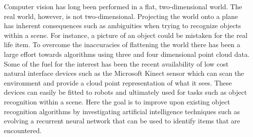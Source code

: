 Computer vision has long been performed in a flat, two-dimensional world. The real world, however, is not two-dimensional. Projecting the world onto a plane has inherent consequences such as ambiguities when trying to recognize objects within a scene. For instance, a picture of an object could be mistaken for the real life item. To overcome the inaccuracies of flattening the world there has been a large effort towards algorithms using three and four dimensional point cloud data. Some of the fuel for the interest has been the recent availability of low cost natural interface devices such as the Microsoft Kinect sensor which can scan the environment and provide a cloud point representation of what it sees. These devices can easily be fitted to robots and ultimately used for tasks such as object recognition within a scene. Here the goal is to improve upon existing object recognition algorithms by investigating artificial intelligence techniques such as evolving a recurrent neural network that can be used to identify items that are encountered. 